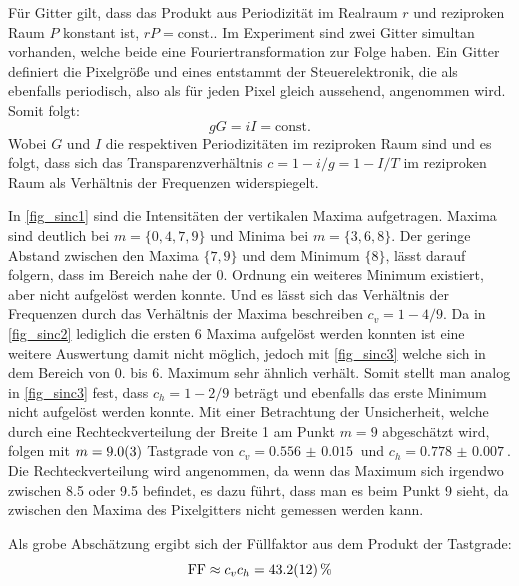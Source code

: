 \documentclass[
	a4paper,
	12pt,
	pagesize,
	ngerman
]{scrartcl}
\begin{document}
		Für Gitter gilt, dass das Produkt aus Periodizität im Realraum $r$ und reziproken Raum $P$ konstant ist, $rP=\text{const.}$.
		Im Experiment sind zwei Gitter simultan vorhanden, welche beide eine Fouriertransformation zur Folge haben.
		Ein Gitter definiert die Pixelgröße und eines entstammt der Steuerelektronik, die als ebenfalls periodisch, also als für jeden Pixel gleich aussehend, angenommen wird.
		Somit folgt:
		\begin{equation}
			gG =iI = \text{const.}
		\end{equation}
		Wobei $G$ und $I$ die respektiven Periodizitäten im reziproken Raum sind und es folgt, dass sich das Transparenzverhältnis $c=1-i/g=1-I/T$ im reziproken Raum als Verhältnis der Frequenzen widerspiegelt.

		In \cref{fig_sinc1} sind die Intensitäten der vertikalen Maxima aufgetragen.
		Maxima sind deutlich bei $m=\{0,4,7,9\}$ und Minima bei $m=\{3,6,8\}$.
		Der geringe Abstand zwischen den Maxima $\{7,9\}$ und dem Minimum $\{8\}$, lässt darauf folgern, dass im Bereich nahe der 0. Ordnung ein weiteres Minimum existiert, aber nicht aufgelöst werden konnte.
		Und es lässt sich das Verhältnis der Frequenzen durch das Verhältnis der Maxima beschreiben $c_v=1-4/9$.
		Da in \cref{fig_sinc2} lediglich die ersten 6 Maxima aufgelöst werden konnten ist eine weitere Auswertung damit nicht möglich, jedoch mit \cref{fig_sinc3} welche sich in dem Bereich von 0. bis 6. Maximum sehr ähnlich verhält.
		Somit stellt man analog in \cref{fig_sinc3} fest, dass $c_h=1-2/9$ beträgt und ebenfalls das erste Minimum nicht aufgelöst werden konnte.
		Mit einer Betrachtung der Unsicherheit, welche durch eine Rechteckverteilung der Breite 1 am Punkt $m=9$ abgeschätzt wird, folgen mit $m=\SI{9+-0.3}{}$ Tastgrade von $c_v=\SI{0.556(15)}{}$ und $c_h=\SI{0.778(7)}{}$.
		Die Rechteckverteilung wird angenommen, da wenn das Maximum sich irgendwo zwischen \num{8,5} oder \num{9,5} befindet, es dazu führt, dass man es beim Punkt \num{9} sieht, da zwischen den Maxima des Pixelgitters nicht gemessen werden kann.

		Als grobe Abschätzung ergibt sich der Füllfaktor aus dem Produkt der Tastgrade:
		\begin{equation}
			\text{FF} \approx c_v c_h =\SI{43.2+-1.2}{\percent}
		\end{equation}
\end{document}
